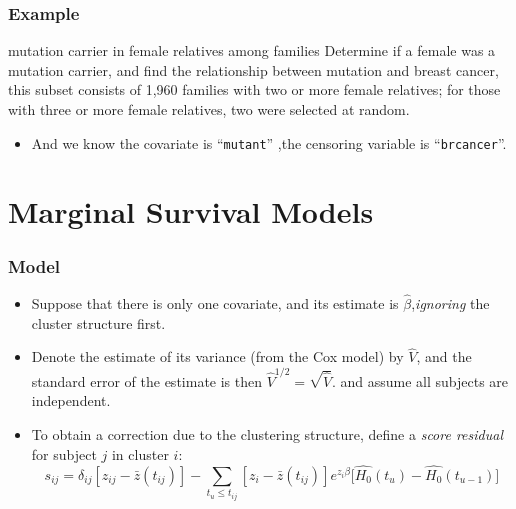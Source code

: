 \documentclass{beamer}
\newcommand{\empr}[1]{{\emph{\color{red}#1}}}
\begin{document}
\pagebreak
\begin{frame}[fragile]
\frametitle{Example}
\begin{problock}{mutation carrier in female relatives among families}
Determine if a female was a mutation carrier, and find the relationship between mutation and breast cancer, this subset consists of 1,960 families with two or more female relatives; for those with three or more female relatives, two were selected at random. 
\end{problock}
\begin{itemize}
\begin{Verbatim}
> ashkenazi[ashkenazi$famID %in% c(1, 9, 94), ]
   famID    brcancer    age    mutant
1      1           0     73         0 
2      1           0     40         0 
7      9           0     89         0 
8      9           1     60         0 
87    94           1     44         1 
88    94           0     45         1 
\end{Verbatim}
\item And we know the covariate is ``\texttt{mutant}'' ,the censoring variable is ``\texttt{brcancer}''.
\end{itemize}
\end{frame}

\section{Marginal Survival Models}
\begin{frame}
\frametitle{Model}
\begin{itemize}
\item Suppose that there is only one covariate, and its estimate is $\hat{\beta}$,\empr{ignoring} the cluster structure first.
\item Denote the estimate of its variance (from the Cox model) by $\hat{V}$, and the standard error of the estimate is then $\hat{V}^{1/2} = \sqrt{\hat{V}}$. and assume all subjects are independent.
\item To obtain a correction due to the clustering structure, define a 
\empr{score residual} for subject $j$ in cluster $i$:
\begin{equation}
s_{ij} = \delta_{ij}[z_{ij}-\bar{z}(t_{ij})] - \sum\limits_{t_{u}\le t_{ij}}^{}[z_{i}-\bar{z}(t_{ij})]e^{z_i\beta}\big[\hat{H_0}(t_{u}) - \hat{H_0}(t_{u - 1}) \big]
\end{equation}
\end{itemize}
\end{frame}
\end{document}
